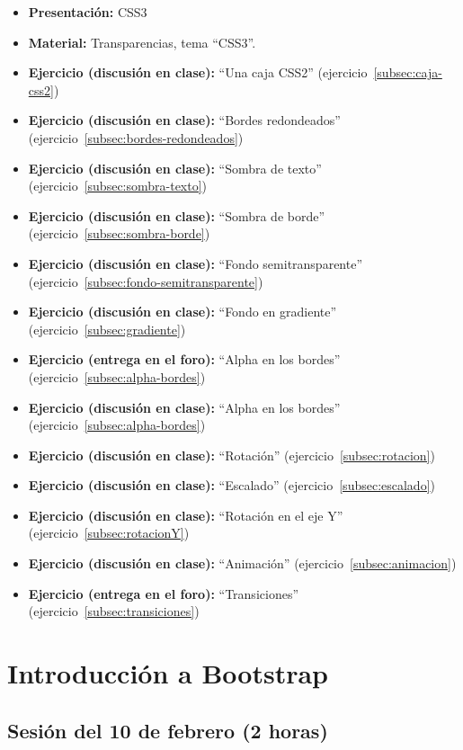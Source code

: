 \documentclass[a4paper,12pt]{report}
\begin{document}
\begin{itemize}
\item \textbf{Presentación:} CSS3
\item \textbf{Material:} Transparencias, tema ``CSS3''.
\item \textbf{Ejercicio (discusión en clase):} ``Una caja CSS2'' (ejercicio~\ref{subsec:caja-css2})
\item \textbf{Ejercicio (discusión en clase):} ``Bordes redondeados'' (ejercicio~\ref{subsec:bordes-redondeados})
\item \textbf{Ejercicio (discusión en clase):} ``Sombra de texto'' (ejercicio~\ref{subsec:sombra-texto})
\item \textbf{Ejercicio (discusión en clase):} ``Sombra de borde'' (ejercicio~\ref{subsec:sombra-borde})
\item \textbf{Ejercicio (discusión en clase):} ``Fondo semitransparente'' (ejercicio~\ref{subsec:fondo-semitransparente})
\item \textbf{Ejercicio (discusión en clase):} ``Fondo en gradiente'' (ejercicio~\ref{subsec:gradiente})
\item \textbf{Ejercicio (entrega en el foro):} ``Alpha en los bordes'' (ejercicio~\ref{subsec:alpha-bordes})
\item \textbf{Ejercicio (discusión en clase):} ``Alpha en los bordes'' (ejercicio~\ref{subsec:alpha-bordes})
\item \textbf{Ejercicio (discusión en clase):} ``Rotación'' (ejercicio~\ref{subsec:rotacion})
\item \textbf{Ejercicio (discusión en clase):} ``Escalado'' (ejercicio~\ref{subsec:escalado})
\item \textbf{Ejercicio (discusión en clase):} ``Rotación en el eje Y'' (ejercicio~\ref{subsec:rotacionY})
\item \textbf{Ejercicio (discusión en clase):} ``Animación'' (ejercicio~\ref{subsec:animacion})
\item \textbf{Ejercicio (entrega en el foro):} ``Transiciones'' (ejercicio~\ref{subsec:transiciones})
\end{itemize}

\section{Introducción a Bootstrap}

\subsection{Sesión del 10 de febrero (2 horas)}
\end{document}
